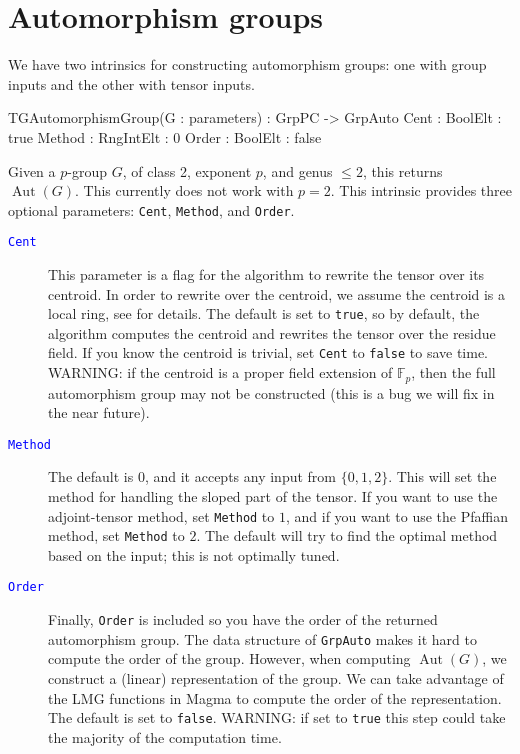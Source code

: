 \documentclass{documentation}
\DeclareMathOperator{\Aut}{Aut}
\begin{document}
\chapter{Automorphism groups}

We have two intrinsics for constructing automorphism groups: one with group inputs and the other with tensor inputs. 

\begin{intrinsics}
TGAutomorphismGroup(G : parameters) : GrpPC -> GrpAuto
    Cent : BoolElt : true
    Method : RngIntElt : 0 
    Order : BoolElt : false
\end{intrinsics}

Given a $p$-group $G$, of class 2, exponent $p$, and genus $\leq 2$, this returns $\Aut(G)$.
This currently does not work with $p=2$.
This intrinsic provides three optional parameters: {\tt Cent}, {\tt Method}, and {\tt Order}.

\begin{description}
\item[\textcolor{blue}{\tt Cent}]
This parameter is a flag for the algorithm to rewrite the tensor over its centroid. 
In order to rewrite over the centroid, we assume the centroid is a local ring, see \cite{eMAGma} for details.
The default is set to {\tt true}, so by default, the algorithm computes the centroid and rewrites the tensor over the residue field.
If you know the centroid is trivial, set {\tt Cent} to {\tt false} to save time.
WARNING: if the centroid is a proper field extension of $\mathbb{F}_p$, then the full automorphism group may not be constructed (this is a bug we will fix in the near future).
\item[\textcolor{blue}{\tt Method}]
The default is $0$, and it accepts any input from $\{ 0,1,2\}$. 
This will set the method for handling the sloped part of the tensor.
If you want to use the adjoint-tensor method, set {\tt Method} to $1$, and if you want to use the Pfaffian method, set {\tt Method} to $2$. The default will try to find the optimal method based on the input; this is not optimally tuned.
\item[\textcolor{blue}{\tt Order}]
Finally, {\tt Order} is included so you have the order of the returned automorphism group. 
The data structure of {\tt GrpAuto} makes it hard to compute the order of the group. 
However, when computing $\Aut(G)$, we construct a (linear) representation of the group. 
We can take advantage of the LMG functions \cite{LMG} in Magma to compute the order of the representation. 
The default is set to {\tt false}. 
WARNING: if set to {\tt true} this step could take the majority of the computation time.
\end{description}
\end{document}
